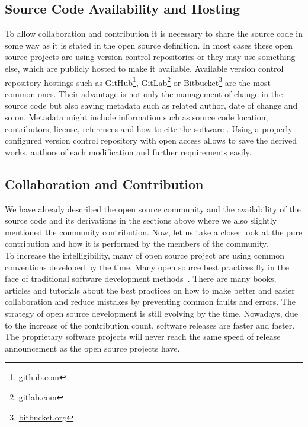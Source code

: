 \documentclass[11pt,a4paper]{article}
\theoremstyle{definition}
\begin{document}
    \subsection{Source Code Availability and Hosting}

    To allow collaboration and contribution it is necessary to share the source code in some way as it is stated in the open source definition. In most cases these open source projects are using version control repositories or they may use something else, which are publicly hosted to make it available. Available version control repository hostings such as GitHub\footnote{\href{https://github.com/}{github.com}}, GitLab\footnote{\href{https://gitlab.com/}{gitlab.com}} or Bitbucket\footnote{\href{https://bitbucket.org/}{bitbucket.org}} are the most common ones. Their advantage is not only the management of change in the source code but also saving metadata such as related author, date of change and so on. Metadata might include information such as source code location, contributors, license, references and how to cite the software \cite{IEEE:OS-BP}. Using a properly configured version control repository with open access allows to save the derived works, authors of each modification and further requirements easily.

    \subsection{Collaboration and Contribution}

    We have already described the open source community and the availability of the source code and its derivations in the sections above where we also slightly mentioned the community contribution. Now, let us take a closer look at the pure contribution and how it is performed by the members of the community.\\

    To increase the intelligibility, many of open source project are using common conventions developed by the time. Many open source best practices fly in the face of traditional software development methods~\cite{KATSAMAKAS2019100872}. There are many books, articles and tutorials about the best practices on how to make better and easier collaboration and reduce mistakes by preventing common faults and errors. The strategy of open source development is still evolving by the time. Nowadays, due to the increase of the contribution count, software releases are faster and faster. The proprietary software projects will never reach the same speed of release announcement as the open source projects have.
\end{document}
